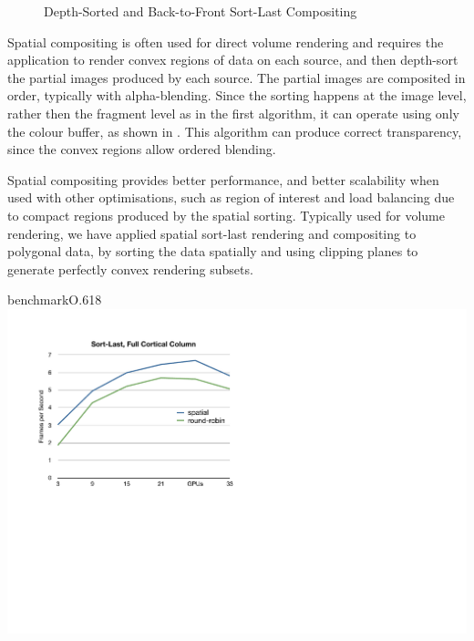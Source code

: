 \begin{figure}[h!t]\center
  \hfil
  \caption{Depth-Sorted and Back-to-Front Sort-Last Compositing}
\end{figure}

Spatial compositing is often used for direct volume rendering and requires the
application to render convex regions of data on each source, and then
depth-sort the partial images produced by each source. The partial images are
composited in order, typically with alpha-blending. Since the sorting happens
at the image level, rather then the fragment level as in the first algorithm,
it can operate using only the colour buffer, as shown in . This
algorithm can produce correct transparency, since the convex regions allow
ordered blending.

Spatial compositing provides better performance, and better scalability when
used with other optimisations, such as region of interest and load balancing
due to compact regions produced by the spatial sorting. Typically used for
volume rendering, we have applied spatial sort-last rendering and compositing
to polygonal data, by sorting the data spatially and using clipping planes to
generate perfectly convex rendering subsets.

\begin{wrapfloat}{benchmark}{O}{.618\textwidth}
 \includegraphics[width=.618\textwidth]{results/dbSpatial}
 {\caption{\label{rDBSpatial}Spatial versus Depth-Sorted Sort-Last Rendering}}
\end{wrapfloat}

